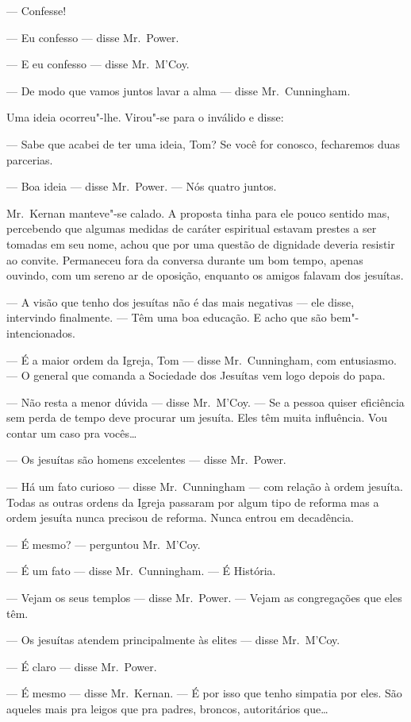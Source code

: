 --- Confesse!

--- Eu confesso --- disse Mr.~Power.

--- E eu confesso --- disse Mr.~M’Coy.

--- De modo que vamos juntos lavar a alma --- disse Mr.~Cunningham.

Uma ideia ocorreu"-lhe.  Virou"-se para o inválido e disse:

--- Sabe que acabei de ter uma ideia, Tom?  Se você for conosco, fecharemos
duas parcerias.

--- Boa ideia --- disse Mr.~Power.  --- Nós quatro juntos.  

Mr.~Kernan manteve"-se calado.  A proposta tinha para ele pouco sentido mas,
percebendo que algumas medidas de caráter espiritual estavam prestes a ser
tomadas em seu nome, achou que por uma questão de dignidade deveria resistir ao
convite.  Permaneceu fora da conversa durante um bom tempo, apenas ouvindo, com
um sereno ar de oposição, enquanto os amigos falavam dos jesuítas.

--- A visão que tenho dos jesuítas não é das mais negativas --- ele disse,
intervindo finalmente.  --- Têm uma boa educação.  E acho que são
bem"-intencionados.

--- É a maior ordem da Igreja, Tom --- disse Mr.~Cunningham, com
entusiasmo.  --- O general que comanda a Sociedade dos Jesuítas vem logo depois
do papa.

--- Não resta a menor dúvida --- disse Mr.~M’Coy.  --- Se a pessoa quiser
eficiência sem perda de tempo deve procurar um jesuíta.  Eles têm muita
influência.  Vou contar um caso pra vocês\ldots{}

--- Os jesuítas são homens excelentes --- disse Mr.~Power.

--- Há um fato curioso --- disse Mr.~Cunningham --- com relação à ordem
jesuíta.  Todas as outras ordens da Igreja passaram por algum tipo de reforma
mas a ordem jesuíta nunca precisou de reforma.  Nunca entrou em decadência.

--- É mesmo? --- perguntou Mr.~M’Coy.

--- É um fato --- disse Mr.~Cunningham.  --- É História.

--- Vejam os seus templos --- disse Mr.~Power.  --- Vejam as congregações que
eles têm.

--- Os jesuítas atendem principalmente às elites --- disse Mr.~M’Coy.

--- É claro --- disse Mr.~Power.

--- É mesmo --- disse Mr.~Kernan.  --- É por isso que tenho simpatia por
eles.  São aqueles mais pra leigos que pra padres, broncos, autoritários
que\ldots{}

